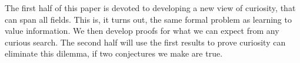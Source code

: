 The first half of this paper is devoted to developing a new view of curiosity, that can span all fields. This is, it turns out, the same formal problem as learning to value information. We then develop proofs for what we can expect from any curious search. The second half will use the first results to prove curiosity can eliminate this dilemma, if two conjectures we make are true.


